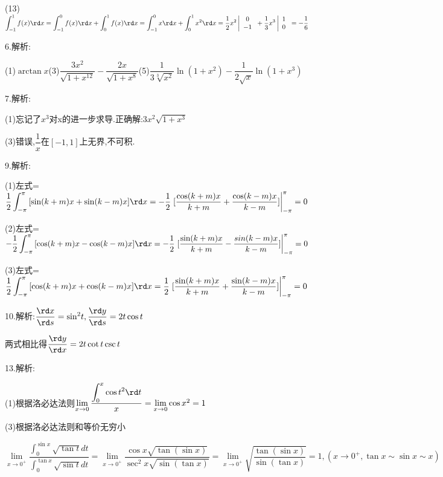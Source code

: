 (13)$\displaystyle\int_{ - 1}^1 {f(x)\rd x}  = \displaystyle\int_{ - 1}^0 {f(x)\rd x + \displaystyle\int_0^1 {f(x)\rd x} }  = \displaystyle\int_{ - 1}^0 {x\rd x + \displaystyle\int_0^1 {{x^2}\rd x} }  = \dfrac{1}{2}{x^2}\left| {\begin{array}{*{20}{c}}
  0 \\ 
  { - 1} 
\end{array}} \right. + \dfrac{1}{3}{x^3}\left| {\begin{array}{*{20}{c}}
  1 \\ 
  0 
\end{array}} \right. =  - \dfrac{1}{6}$

6.解析:

(1)$\arctan x$(3)$\dfrac{{3{x^2}}}{{\sqrt {1 + {x^{12}}} }} - \dfrac{{2x}}{{\sqrt {1 + {x^8}} }}$(5)$\dfrac{1}{{3\sqrt[3]{{{x^2}}}}}\ln (1 + {x^2}) - \dfrac{1}{{2\sqrt x }}\ln (1 + {x^3})$

7.解析:

(1)忘记了$x^3$对x的进一步求导.正确解:$3{x^2}\sqrt {1 + {x^3}} $

(3)错误,$\dfrac{1}{x}$在$[-1,1]$上无界,不可积.

9.解析:

(1)左式=$\dfrac{1}{2}\displaystyle\int_{ - \pi }^\pi  {[\sin (k + m)x + \sin (k - m)x]\rd x =  - \dfrac{1}{2}\left. {[\dfrac{{\cos (k + m)x}}{{k + m}} + \dfrac{{\cos (k - m)x}}{{k - m}}]} \right|} _{ - \pi }^\pi  = 0$

(2)左式=$ - \dfrac{1}{2}\displaystyle\int_{ - \pi }^\pi  {[\cos (k + m)x - \cos (k - m)x]\rd x =  - \dfrac{1}{2}\left. {[\dfrac{{\sin (k + m)x}}{{k + m}} - \dfrac{{sin(k - m)x}}{{k - m}}]} \right|} _{ - \pi }^\pi  = 0$

(3)左式=$\dfrac{1}{2}\displaystyle\int_{ - \pi }^\pi  {[\cos (k + m)x + \cos (k - m)x]\rd x = \dfrac{1}{2}\left. {[\frac{{\sin (k + m)x}}{{k + m}} + \dfrac{{\sin (k - m)x}}{{k - m}}]} \right|} _{ - \pi }^\pi  = 0$

10.解析:$\dfrac{{\rd x}}{{\rd s}} = {\sin ^2}t,\dfrac{{\rd y}}{{\rd s}} = 2t\cos t$

两式相比得$\dfrac{{\rd y}}{{\rd x}} = 2t\cot t\csc t$

13.解析:

(1)根据洛必达法则$\mathop {\lim }\limits_{x \to 0} \dfrac{{\displaystyle\int_0^x {\cos {t^2}\rd t} }}{x} = \mathop {\lim }\limits_{x \to 0} \cos {x^2} = 1$

(3)根据洛必达法则和等价无穷小

$\mathop {\lim }\limits_{x \to {0^+ }} \dfrac{{\displaystyle\int_0^{\sin x} {\sqrt {\tan t} dt} }}{{\displaystyle\int_0^{\tan x} {\sqrt {\sin t} dt} }} = \mathop {\lim }\limits_{x \to {0^+ }} \dfrac{{\cos x\sqrt {\tan (\sin x )}}}{{{{\sec }^2}x\sqrt {\sin (\tan x)} }} = \mathop {\lim }\limits_{x \to {0^+ }} \sqrt {\dfrac{{\tan (\sin x)}}{{\sin (\tan x)}}}  = 1,\left( {x \to {0^+ },\tan x \sim \sin x \sim x} \right)$


